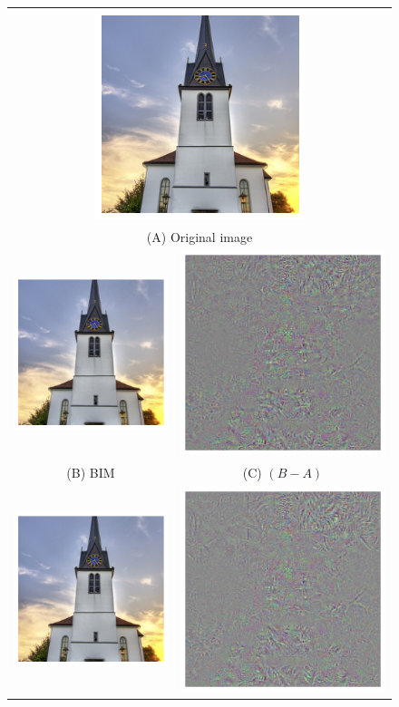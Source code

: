 \begin{figure}[ht]
    \centering
    \begin{tabular}{@{}cc@{}} \multicolumn{2}{c}{
            \includegraphics[width=.25\columnwidth]{Figures/related/attacks/original.png}
        }                       \\
        \multicolumn{2}{c}{ (A) Original image }
        \\
        \includegraphics[width=.32\columnwidth]{Figures/related/attacks/bim_1_chicken.png}
                &
        \includegraphics[width=.32\columnwidth]{Figures/related/attacks/bim_1_chicken_diff2.png}
        \\
        (B) BIM & (C) $(B - A)$ \\
        \includegraphics[width=.32\columnwidth]{Figures/related/attacks/ddn_0.85_chicken.png}
                &
        \includegraphics[width=.32\columnwidth]{Figures/related/attacks/ddn_0.85_chicken_diff2.png}

\end{tabular}
\end{figure}
